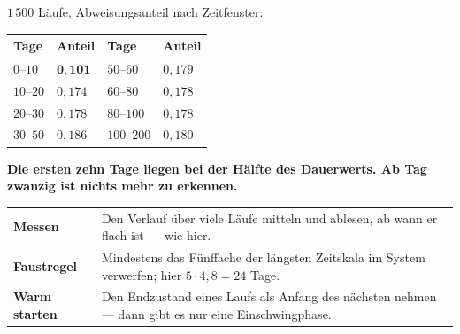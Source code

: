 \begin{merksatz}
$1\,500$ Läufe, Abweisungsanteil nach Zeitfenster:

\begin{center}
{\small
\renewcommand{\arraystretch}{1.46}
\begin{tabular}{@{}P{2.4cm}P{2.0cm}P{2.4cm}P{2.0cm}@{}}
\toprule
\textbf{Tage} & \textbf{Anteil} & \textbf{Tage} & \textbf{Anteil}\\
\midrule
$0$--$10$ & $\mathbf{0{,}101}$ & $50$--$60$ & $0{,}179$\\
$10$--$20$ & $0{,}174$ & $60$--$80$ & $0{,}178$\\
$20$--$30$ & $0{,}178$ & $80$--$100$ & $0{,}178$\\
$30$--$50$ & $0{,}186$ & $100$--$200$ & $0{,}180$\\
\bottomrule
\end{tabular}}
\end{center}

\begin{center}
\begin{minipage}{0.9\textwidth}
\textbf{Die ersten zehn Tage liegen bei der Hälfte des Dauerwerts. Ab Tag zwanzig ist nichts mehr zu erkennen.}
\end{minipage}
\end{center}

\begin{center}
{\small
\renewcommand{\arraystretch}{1.5}
\begin{tabular}{@{}P{2.6cm}P{6.0cm}@{}}
\toprule
\textbf{Messen} & Den Verlauf über viele Läufe mitteln und ablesen, ab wann er flach ist --- wie hier.\\
\textbf{Faustregel} & Mindestens das Fünffache der längsten Zeitskala im System verwerfen; hier $5\cdot4{,}8 = 24$ Tage.\\
\textbf{Warm starten} & Den Endzustand eines Laufs als Anfang des nächsten nehmen --- dann gibt es nur eine Einschwingphase.\\
\bottomrule
\end{tabular}}
\end{center}

\begin{center}
\begin{minipage}{0.88\textwidth}
\end{minipage}
\end{center}
\end{merksatz}

